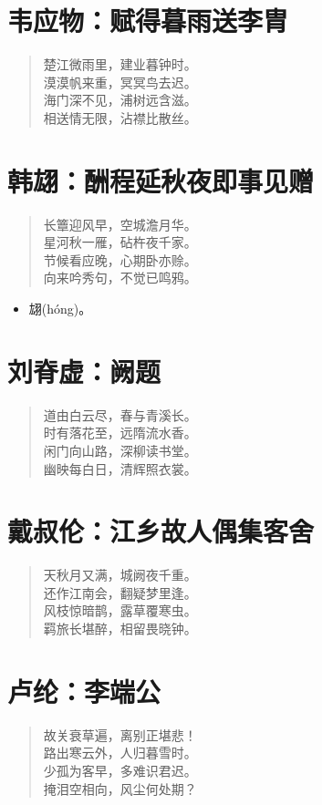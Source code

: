 \documentclass[12pt,oneside]{book}
\newenvironment{shici}{%
\begin{verse}\centering\yanti\large\hspace{12pt}}{\end{verse}}
\begin{document}
\begin{common-format}
\chapter{韦应物：赋得暮雨送李胄}
\begin{shici}
楚江微雨里，建业暮钟时。\\
漠漠帆来重，冥冥鸟去迟。\\
海门深不见，浦树远含滋。\\
相送情无限，沾襟比散丝。
\end{shici}

\chapter{韩翃：酬程延秋夜即事见赠}
\begin{shici}
长簟迎风早，空城澹月华。\\
星河秋一雁，砧杵夜千家。\\
节候看应晚，心期卧亦赊。\\
向来吟秀句，不觉已鸣鸦。
\end{shici}

\begin{itemize}
\item 翃(hóng)。
\end{itemize}

\chapter{刘脊虚：阙题}
\begin{shici}
道由白云尽，春与青溪长。\\
时有落花至，远隋流水香。\\
闲门向山路，深柳读书堂。\\
幽映每白日，清辉照衣裳。
\end{shici}

\chapter{戴叔伦：江乡故人偶集客舍}
\begin{shici}
天秋月又满，城阙夜千重。\\
还作江南会，翻疑梦里逢。\\
风枝惊暗鹊，露草覆寒虫。\\
羁旅长堪醉，相留畏晓钟。
\end{shici}

\chapter{卢纶：李端公}
\begin{shici}
故关衰草遍，离别正堪悲！\\
路出寒云外，人归暮雪时。\\
少孤为客早，多难识君迟。\\
掩泪空相向，风尘何处期？
\end{shici}


\end{common-format}
\end{document}
